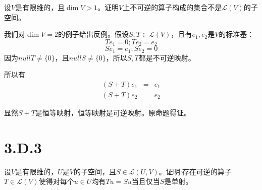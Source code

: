 \documentclass[10pt,a4paper,UTF8]{article}
\begin{document}
\begin{problem}
设\(V\)是有限维的，且\(\dim V > 1\)。证明\(V\)上不可逆的算子构成的集合不是\(\mathcal{L}(V)\)的子空间。
\end{problem}

\begin{answer}
我们对\(\dim V = 2\)的例子给出反例。假设\(S,T\in \mathcal{L}(V)\)，且有\(e_{1},e_{2}\)是\(V\)的标准基：
\[Te_{1} = 0;Te_{2} = e_{2}\]
\[Se_{1} = e_{1};Se_{2} = 0\]
因为\(nullT \neq \{0\}\)，且\(nullS \neq \{0\}\)，所以\(S,T\)都是不可逆映射。

所以有
\begin{eqnarray*}
(S+T)e_{1}&=&e_{1} \\
(S+T)e_{2}&=&e_{2}
\end{eqnarray*}

显然\(S+T\)是恒等映射，恒等映射是可逆映射。原命题得证。
\end{answer}

\section{3.D.3}
\label{sec:org1f0cab9}


\begin{problem}
设\(V\)是有限维的，\(U\)是\(V\)的子空间，且\(S\in \mathcal{L}(U,V)\)。证明:存在可逆的算子\(T\in \mathcal{L}(V)\)使得对每个\(u\in U\)均有\(Tu = Su\)当且仅当\(S\)是单射。
\end{problem}
\end{document}
